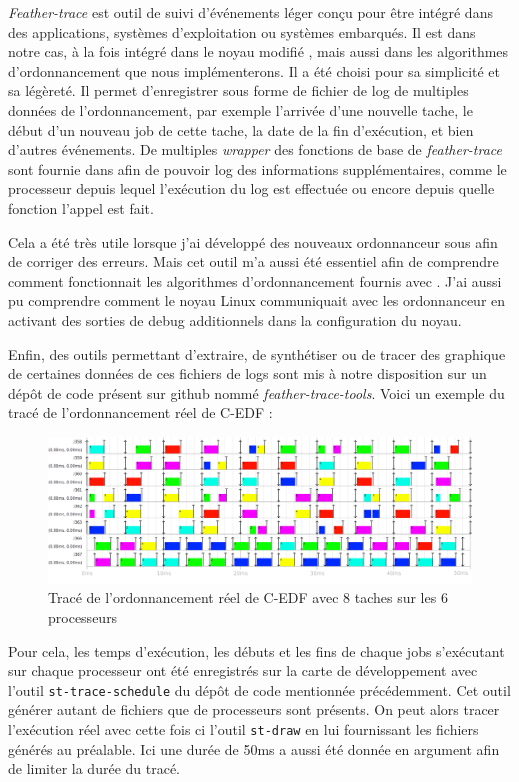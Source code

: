 \textit{Feather-trace} \cite{brandenburg2007feather} est outil de suivi d'événements léger conçu pour être intégré dans des applications,  systèmes d'exploitation ou systèmes embarqués. Il est dans notre cas, à la fois intégré dans le noyau modifié \litmus, mais aussi dans les algorithmes d'ordonnancement que nous implémenterons. Il a été choisi pour sa simplicité et sa légèreté. Il permet d'enregistrer sous forme de fichier de log de multiples données de l'ordonnancement, par exemple l'arrivée d'une nouvelle tache, le début d'un nouveau job de cette tache, la date de la fin d'exécution, et bien d'autres événements. De multiples \textit{wrapper} des fonctions de base de \textit{feather-trace} sont fournie dans \litmus afin de pouvoir log des informations supplémentaires, comme le processeur depuis lequel l’exécution du log est effectuée ou encore depuis quelle fonction l'appel est fait.

Cela a été très utile lorsque j'ai développé des nouveaux ordonnanceur sous \litmus afin de corriger des erreurs. Mais cet outil m'a aussi été essentiel afin de comprendre comment fonctionnait les algorithmes d’ordonnancement fournis avec \litmus. J'ai aussi pu comprendre comment le noyau Linux communiquait avec les ordonnanceur en activant des sorties de debug additionnels dans la configuration du noyau.

Enfin, des outils permettant d'extraire, de synthétiser ou de tracer des graphique de certaines données de ces fichiers de logs sont mis à notre disposition sur un dépôt de code présent sur github nommé \textit{feather-trace-tools}. Voici un exemple du tracé de l'ordonnancement réel de C-EDF :


\begin{figure}[H]
     \centering
     \includegraphics[width=\textwidth]{Images/schedule_host=rock960_scheduler=C-EDF_trace=C-EDF-OFFSET.png}
     \caption{Tracé de l'ordonnancement réel de C-EDF avec 8 taches sur les 6 processeurs}
     \label{fig:trace-cedf}
\end{figure}


Pour cela, les temps d'exécution, les débuts et les fins de chaque jobs s'exécutant sur chaque processeur ont été enregistrés sur la carte de développement avec l'outil \texttt{st-trace-schedule} du dépôt de code mentionnée précédemment. Cet outil générer autant de fichiers que de processeurs sont présents. On peut alors tracer l’exécution réel avec cette fois ci l'outil \texttt{st-draw} en lui fournissant les fichiers générés au préalable. Ici une durée de 50ms a aussi été donnée en argument afin de limiter la durée du tracé.